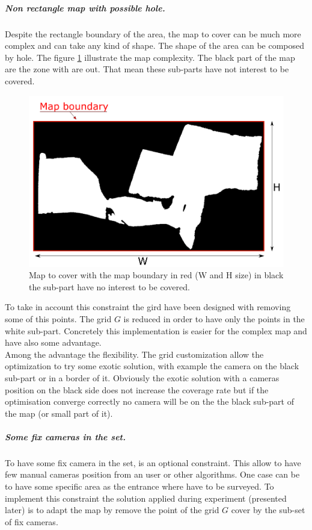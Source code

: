 \subparagraph{Non rectangle map with possible hole.}
Despite the rectangle boundary of the area, the map to cover can be much more complex and can take any kind of shape. The shape of the area can be composed by hole. The figure \ref{fig:boundaryMap} illustrate the map complexity. The black part of the map are the zone with are out. That mean these sub-parts have not interest to be covered.
 \begin{figure}[t!]
 \begin{center}
   \includegraphics[width=\linewidth]{img/BoundaryMap2.png}
  \caption{Map to cover with the map boundary in red (W and H size) in black the sub-part have no interest to  be covered.   }\label{fig:boundaryMap}
  \endminipage\hfill
  \end{center}
\end{figure}
To take in account this constraint the gird have been designed with removing some of this points.
The grid $G$ is reduced in order to have only the points in the white sub-part. 
Concretely this implementation is easier for the complex map and have also some advantage. \\
Among the advantage the flexibility. The grid customization  allow the optimization to try some exotic solution, with example the camera on the black sub-part or  in a border of it.  Obviously  the exotic solution with a cameras position on the black side does not increase the coverage rate  but if the optimisation converge correctly no camera will be on the the black sub-part of the map (or small part of it).\\

\subparagraph{Some fix cameras in the set.}
To have some fix camera in the set, is an optional constraint. This allow to have few manual cameras position from an user or other algorithms.
One case can be to have some specific area as the entrance where have to be surveyed.  
To implement this constraint the solution applied during experiment (presented later) is to adapt the map by remove the point of the grid $G$ cover by the sub-set of fix cameras.\\

